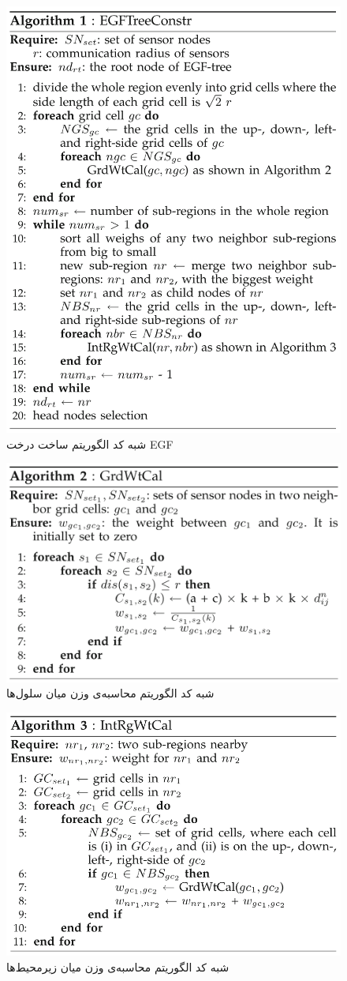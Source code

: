 \begin{figure}
	\centering
	\includegraphics[width=0.7\linewidth]{figs/egf-al1}
	\caption {شبه کد الگوریتم ساخت درخت EGF}
	\label{fig:egf-al1}
\end{figure}

\begin{figure}
	\centering
	\includegraphics[width=0.7\linewidth]{figs/egf-al2}
	\caption {شبه کد الگوریتم محاسبه‌ی وزن میان سلول‌ها}
	\label{fig:egf-al2}
\end{figure}

\begin{figure}
	\centering
	\includegraphics[width=0.7\linewidth]{figs/egf-al3}
	\caption {شبه کد الگوریتم محاسبه‌ی وزن میان زیرمحیط‌ها}
	\label{fig:egf-al3}
\end{figure}

